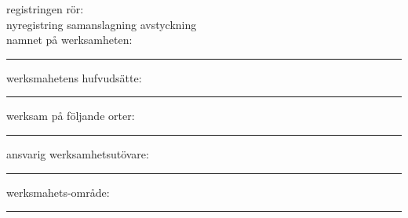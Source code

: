\documentclass{letter}
\begin{document}
registringen rör:\\
\Square nyregistring
\Square samanslagning
\Square	avstyckning
\\

namnet på werksamheten:
\vspace*{1cm}
\hrule
werksmahetens hufvudsätte:
\vspace*{1cm}
\hrule
werksam på följande orter:
\vspace*{1cm}
\hrule
ansvarig werksamhetsutövare:
\vspace*{1cm}
\hrule
werksmahets-område:
\vspace*{1cm}
\hrule
\end{document}
